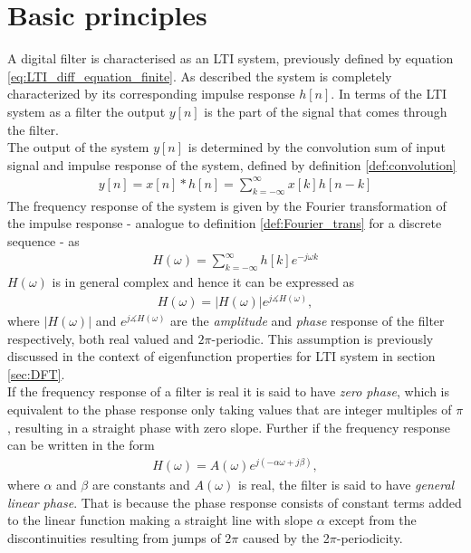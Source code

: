 \section{Basic principles} \label{sec:basic_filter}
A digital filter is characterised as an LTI system, previously defined by equation \eqref{eq:LTI_diff_equation_finite}. As described the system is completely characterized by its corresponding impulse response $h[n]$. In terms of the LTI system as a filter the output $y[n]$ is the part of the signal that comes through the filter. \\
The output of the system $y[n]$ is determined by the convolution sum of input signal and impulse response of the system, defined by definition \eqref{def:convolution} 
\begin{align}
y[n] = x[n]*h[n] = \sum_{k=-\infty}^{\infty} x[k]h[n-k]
\end{align}    
The frequency response of the system is given by the Fourier transformation of the impulse response - analogue to definition \ref{def:Fourier_trans} for a discrete sequence - as
\begin{align}\label{eq:freq_res}
H(\omega)=\sum_{k=-\infty}^{\infty}h[k]e^{-j\omega k}
\end{align}
$H(\omega)$ is in general complex and hence it can be expressed as
\begin{align}
H(\omega)=|H(\omega)|e^{j\measuredangle H(\omega)},
\end{align}  
where $|H(\omega)|$ and $e^{j\measuredangle H(\omega)}$ are the \textit{amplitude} and \textit{phase} response of the filter respectively, both real valued and $2\pi$-periodic. This assumption is previously discussed in the context of eigenfunction properties for LTI system in section \ref{sec:DFT}.\\ 
If the frequency response of a filter is real it is said to have \textit{zero phase}, which is equivalent to the phase response only taking values that are integer multiples of $\pi$, resulting in a straight phase with zero slope. Further if the frequency response can be written in the form 
\begin{align}\label{eq:lin_pha}
H(\omega)=A(\omega)e^{j(-\alpha\omega + j\beta)} ,
\end{align}
where $\alpha$ and $\beta$ are constants and $A(\omega)$ is real, the filter is said to have \textit{general linear phase}. That is because the phase response consists of constant terms added to the linear function making a straight line with slope $\alpha$ except from the discontinuities resulting from jumps of $2\pi$ caused by the 2$\pi$-periodicity. \\
